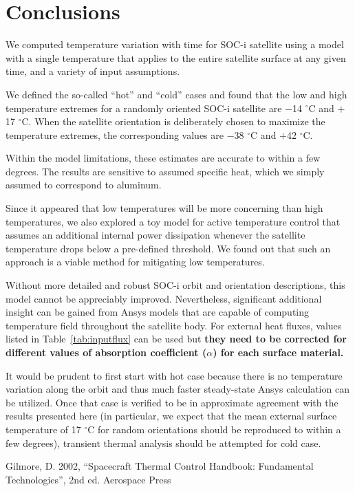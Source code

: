 \documentclass[]{aastex62}
\begin{document}
\section{Conclusions \label{sec:conclusions}} 

We computed temperature variation with time for SOC-i satellite using a model with a single 
temperature that applies to the entire satellite surface at any given time, and a variety of input 
assumptions. 
 
We defined the so-called ``hot'' and ``cold'' cases and found that the low and high temperature 
extremes for a randomly oriented SOC-i satellite are $-$14 $^\circ$C and $+$17 $^\circ$C. When the 
satellite orientation is deliberately chosen to maximize the temperature extremes, the corresponding 
values are $-$38 $^\circ$C and $+$42 $^\circ$C. 

Within the model limitations, these estimates are accurate to within a few degrees. The results are 
sensitive to assumed specific heat, which we simply assumed to correspond to aluminum. 

Since it appeared that low temperatures will be more concerning than high temperatures,
we also explored a toy model for active temperature control that assumes an additional internal 
power dissipation whenever the satellite temperature drops below a pre-defined threshold. 
We found out that such an approach is a viable method for mitigating low temperatures.

Without more detailed and robust SOC-i orbit and orientation descriptions, this model cannot
be appreciably improved. Nevertheless, significant additional insight can be gained from Ansys
models that are capable of computing temperature field throughout the satellite body. For
external heat fluxes, values listed in Table~\ref{tab:inputflux} can be used but {\bf they need
to be corrected for different values of absorption coefficient ($\alpha$) for each surface 
material.} 

It would be prudent to first start with hot case because there is no temperature variation along
the orbit and thus much faster steady-state Ansys calculation can be utilized. Once that case is verified
to be in approximate agreement with the results presented here (in particular, we expect that
the mean external surface temperature of 17 $^\circ$C for random orientations should be reproduced
to within a few degrees), transient thermal analysis should be attempted for cold case. 


\vskip 0.2in 
Gilmore, D. 2002, ``Spacecraft Thermal Control Handbook: Fundamental Technologies'', 2nd ed. Aerospace Press 
\end{document}
